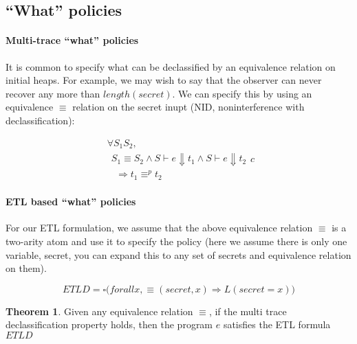 \documentclass{sig-alternate}
\theoremstyle{definition}
\newtheorem{thm}{Theorem}[section]
\newcommand{\tr}{t}
\newcommand{\talways}{\square}
\begin{document}
{\subsection{``What'' policies}

\paragraph*{Multi-trace ``what'' policies}

It is common to specify what can be declassified by an equivalence
relation on initial heaps.  For example, we may wish to say that the
observer can never recover any more than $length(secret)$.  We can
specify this by using an equivalence $\equiv$ relation on the secret
inupt (NID, noninterference with declassification):

\begin{displaymath}
\begin{array}{l}
    \forall S_1 S_2, \\
    ~~ S_1 \equiv S_2
    \wedge S \vdash e \Downarrow \tr_1 
    \wedge S \vdash e \Downarrow \tr_2 \\
    ~~ ~~ \Rightarrow \tr_1 \equiv^p \tr_2
\end{array}{c}
\end{displaymath}

\paragraph*{ETL based ``what'' policies}

For our ETL formulation, we assume that the above equivalence relation
$\equiv$ is a two-arity atom and use it to specify the policy (here we
assume there is only one variable, secret, you can expand this to any
set of secrets and equivalence relation on them).

\begin{displaymath}
  ETLD = \talways \big(forall x, \equiv (secret,x) \Rightarrow L(secret=x) \big)
\end{displaymath}

\begin{thm}
  Given any equivalence relation $\equiv$, if the multi trace
  declassification property holds, then the program $e$ satisfies the
  ETL formula $ETLD$
\end{thm}

}
\end{document}
